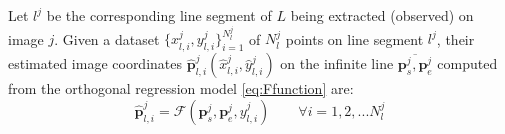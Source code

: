 

Let $l^j$ be the corresponding line segment of $L$ being extracted (observed) on image $j$. Given a dataset $\{x^j_{l,i},y^j_{l,i}\}^{N^j_l}_{i=1}$ of $N^j_l$ points on line segment $l^j$, their estimated image coordinates $\hat{\mathbf{p}}^j_{l,i}(\hat{x}^j_{l,i},\hat{y}^j_{l,i})$ on the infinite line $\overline{\mathbf{p}^j_s,\mathbf{p}^j_e}$ computed from the orthogonal regression model \eqref{eq:Ffunction} are:
\begin{equation} \label{eq:obsmodel-linefitting}
\hat{\mathbf{p}}^j_{l,i} = \mathcal{F}(\mathbf{p}^j_s,\mathbf{p}^j_e,y^j_{l,i})
\qquad
\forall i=1,2,...N^j_l
\end{equation}


